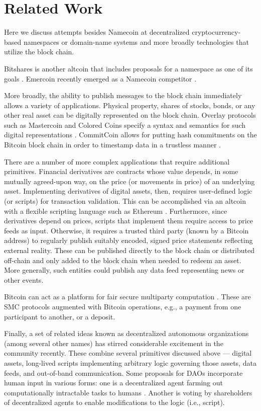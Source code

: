 \section{Related Work}
\label{sec:related}

Here we discuss attempts besides Namecoin at decentralized cryptocurrency-based namespaces or domain-name systems and more broadly technologies that utilize the block chain.

Bitshares is another altcoin that includes proposals for a namespace as one of its goals \cite{bitsharesdns}. Emercoin recently emerged as a Namecoin competitor \cite{emercoin}. 

More broadly, the ability to publish messages to the block chain immediately allows a variety of applications. Physical property, shares of stocks, bonds, or any other real asset can be digitally represented on the block chain. Overlay protocols such as Mastercoin and Colored Coins specify a syntax and semantics for such digital representations \cite{mastercoinspec, rosenfeld2012overview}. CommitCoin allows for putting hash commitments on the Bitcoin block chain in order to timestamp data in a trustless manner \cite{clark2012commitcoin}.

There are a number of more complex applications that require additional primitives. Financial derivatives are contracts whose value depends, in some mutually agreed-upon way, on the price (or movements in price) of an underlying asset. Implementing derivatives of digital assets, then, requires user-defined logic (or scripts) for transaction validation. This can be accomplished via an altcoin with a flexible scripting language such as Ethereum \cite{ethereumwhitepaper}. Furthermore, since derivatives depend on prices, scripts that implement them require access to price feeds as input. Otherwise, it requires a trusted third party (known by a Bitcoin address) to regularly publish suitably encoded, signed price statements reflecting external reality. These can be published directly to the block chain or distributed off-chain and only added to the block chain when needed to redeem an asset. More generally, such entities could publish any data feed representing news or other events.

Bitcoin can act as a platform for fair secure multiparty computation \cite{andrychowicz2014secure, bentov2014use, kumaresan2014use}. These are SMC protocols augmented with Bitcoin operations, e.g., a payment from one participant to another, or a deposit.

Finally, a set of related ideas known as decentralized autonomous organizations (among several other names) has stirred considerable excitement in the community recently. These combine several primitives discussed above --- digital assets, long-lived scripts implementing arbitrary logic governing those assets, data feeds, and out-of-band communication. Some proposals for DAOs incorporate human input in various forms: one is a decentralized agent farming out computationally intractable tasks to humans \cite{buterindao}. Another is voting by shareholders of decentralized agents to enable modifications to the logic (i.e., script). 

